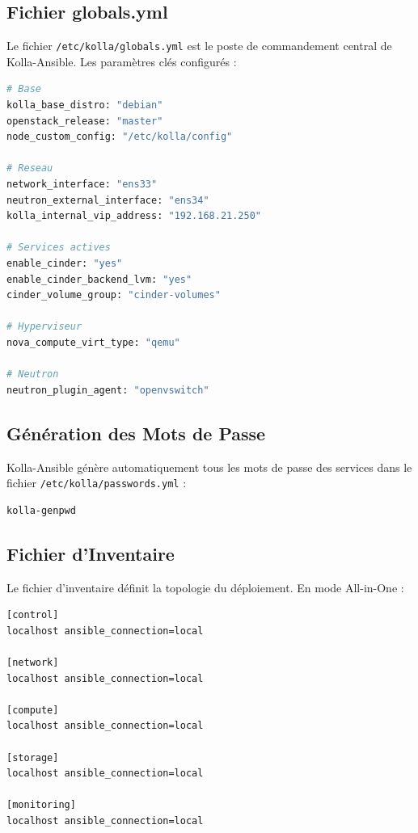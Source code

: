 \documentclass[12pt,a4paper,oneside]{book}
\begin{document}
\subsection{Fichier globals.yml}
Le fichier \texttt{/etc/kolla/globals.yml} est le poste de commandement central de Kolla-Ansible. Les param\`etres cl\'es configur\'es :

\begin{lstlisting}[language=bash, caption={Extrait de globals.yml}]
# Base
kolla_base_distro: "debian"
openstack_release: "master"
node_custom_config: "/etc/kolla/config"

# Reseau
network_interface: "ens33"
neutron_external_interface: "ens34"
kolla_internal_vip_address: "192.168.21.250"

# Services actives
enable_cinder: "yes"
enable_cinder_backend_lvm: "yes"
cinder_volume_group: "cinder-volumes"

# Hyperviseur
nova_compute_virt_type: "qemu"

# Neutron
neutron_plugin_agent: "openvswitch"
\end{lstlisting}

\subsection{G\'en\'eration des Mots de Passe}
Kolla-Ansible g\'en\`ere automatiquement tous les mots de passe des services dans le fichier \texttt{/etc/kolla/passwords.yml} :
\begin{lstlisting}[language=bash, caption={G\'en\'eration automatique des mots de passe}]
kolla-genpwd
\end{lstlisting}

\subsection{Fichier d'Inventaire}
Le fichier d'inventaire d\'efinit la topologie du d\'eploiement. En mode All-in-One :
\begin{lstlisting}[language=bash, caption={Inventaire All-in-One}]
[control]
localhost ansible_connection=local

[network]
localhost ansible_connection=local

[compute]
localhost ansible_connection=local

[storage]
localhost ansible_connection=local

[monitoring]
localhost ansible_connection=local
\end{lstlisting}
\end{document}
